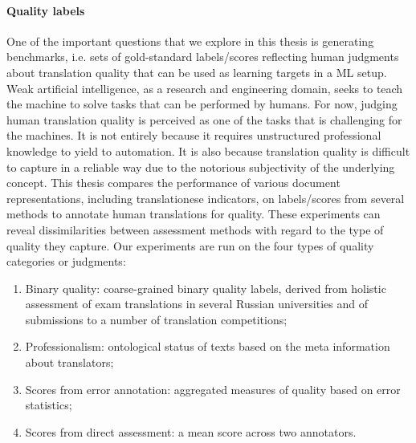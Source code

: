 \paragraph{Quality labels} One of the important questions that we explore in this thesis is generating benchmarks, i.e. sets of gold-standard labels/scores reflecting human judgments about translation quality that can be used as learning targets in a ML setup. 
Weak artificial intelligence, as a research and engineering domain, seeks to teach the machine to solve tasks that can be performed by humans. 
For now, judging human translation quality is perceived as one of the tasks that is challenging for the machines. It is not entirely because it requires unstructured professional knowledge to yield to automation. It is also because translation quality is difficult to capture in a reliable way due to the notorious subjectivity of the underlying concept. This thesis compares the performance of various document representations, including translationese indicators, on labels/scores from several methods to annotate human translations for quality. These experiments can reveal dissimilarities between assessment methods with regard to the type of quality they capture. 
Our experiments are run on the four types of quality categories or judgments:
\begin{enumerate}\compresslist{}
	\item Binary quality: coarse-grained binary quality labels, derived from holistic assessment of exam translations in several Russian universities and of submissions to a number of translation competitions;
	\item Professionalism: ontological status of texts based on the meta information about translators;
	\item Scores from error annotation: aggregated measures of quality based on error statistics;
	\item Scores from direct assessment: a mean score across two annotators.
\end{enumerate}

